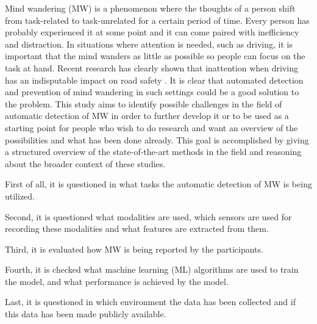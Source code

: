 Mind wandering (MW) is a phenomenon where the thoughts of a person shift from task-related to task-unrelated for a certain period of time.
Every person has probably experienced it at some point and it can come paired with inefficiency and distraction. 
In situations where attention is needed, such as driving, it is important that the mind wanders as little as possible so people can focus on the task at hand. 
Recent research has clearly shown that inattention when driving has an indisputable impact on road safety \cite{berthie2015restless}. 
It is clear that automated detection and prevention of mind wandering in such settings could be a good solution to the problem. 
This study aims to identify possible challenges in the field of automatic detection of MW in order to further develop it or to be used as a starting point for people who wish to do research and want an overview of the possibilities and what has been done already.
This goal is accomplished by giving a structured overview of the state-of-the-art methods in the field and reasoning about the broader context of these studies.

First of all, it is questioned in what tasks the automatic detection of MW is being utilized. 

Second, it is questioned what modalities are used, which sensors are used for recording these modalities and what features are extracted from them. 

Third, it is evaluated how MW is being reported by the participants. 

Fourth, it is checked what machine learning (ML) algorithms are used to train the model, and what performance is achieved by the model.

Last, it is questioned in which environment the data has been collected and if this data has been made publicly available.